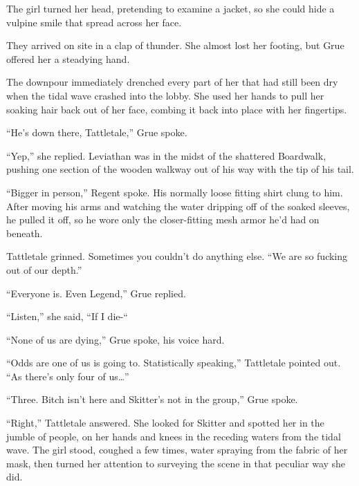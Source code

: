 The girl turned her head, pretending to examine a jacket, so she could hide a vulpine smile that spread across her face.



\sectionbreak



They arrived on site in a clap of thunder.  She almost lost her footing, but Grue offered her a steadying hand.



The downpour immediately drenched every part of her that had still been dry when the tidal wave crashed into the lobby.  She used her hands to pull her soaking hair back out of her face, combing it back into place with her fingertips.



``He's down there, Tattletale,'' Grue spoke.



``Yep,'' she replied.  Leviathan was in the midst of the shattered Boardwalk, pushing one section of the wooden walkway out of his way with the tip of his tail.



``Bigger in person,'' Regent spoke.  His normally loose fitting shirt clung to him.  After moving his arms and watching the water dripping off of the soaked sleeves, he pulled it off, so he wore only the closer-fitting mesh armor he'd had on beneath.



Tattletale grinned.  Sometimes you couldn't do anything else.  ``We are so fucking out of our depth.''



``Everyone is.  Even Legend,'' Grue replied.



``Listen,'' she said, ``If I die-``



``None of us are dying,'' Grue spoke, his voice hard.



``Odds are one of us is going to.  Statistically speaking,'' Tattletale pointed out.  ``As there's only four of us\ldots''



``Three.  Bitch isn't here and Skitter's not in the group,'' Grue spoke.



``Right,'' Tattletale answered.  She looked for Skitter and spotted her in the jumble of people, on her hands and knees in the receding waters from the tidal wave.  The girl stood, coughed a few times, water spraying from the fabric of her mask, then turned her attention to surveying the scene in that peculiar way she did.



